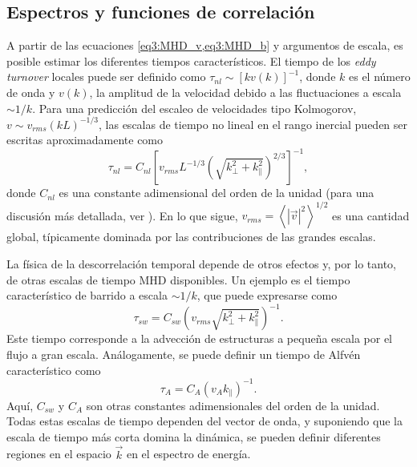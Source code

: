 \subsection{Espectros y funciones de correlación}\label{sec3:Wfspectrum_and_Gamma}

A partir de las ecuaciones \cref{eq3:MHD_v,eq3:MHD_b} y argumentos de
escala, es posible estimar los diferentes tiempos característicos. El
tiempo de los \textit{eddy turnover} locales puede ser definido como
$\tau_{nl} \sim \left[ k v(k) \right]^{-1}$, donde $k$ es el número de
onda y $v(k)$, la amplitud de la velocidad debido a las fluctuaciones
a escala $\sim 1/k$. Para una predicción del escaleo de velocidades
tipo Kolmogorov, $v \sim v_{rms} \left(kL\right)^{-1/3}$, las escalas
de tiempo no lineal en el rango inercial pueden ser escritas
aproximadamente como
\begin{equation}
\tau_{nl} = C_{nl} \left [
   v_{rms} L^{-1/3} \left(\sqrt{k^2_\perp +
   k^2_\parallel}\right)^{2/3}\right ]^{-1},
\label{eq3:taunl}
\end{equation}
donde $C_{nl}$ es una constante adimensional del orden de la
unidad (para una discusión más detallada,
ver \cite{zhou_magnetohydrodynamic_2004}). En lo que sigue, $v_{rms}
= \left\langle |\vec{v}|^2 \right\rangle ^{1/2}$ es una cantidad
global, típicamente dominada por las contribuciones de las grandes
escalas.

La física de la descorrelación temporal depende de otros efectos y,
por lo tanto, de otras escalas de tiempo MHD disponibles. Un ejemplo
es el tiempo característico de barrido a escala $\sim 1/k$, que puede
expresarse como
\begin{equation}
\tau_{sw} = C_{sw} \left( v_{rms}\sqrt{k^2_\perp + k^2_\parallel}
    \right)^{-1}.
\label{eq3:tausw}
\end{equation}
Este tiempo corresponde a la advección
de estructuras a pequeña escala por el flujo a gran
escala. Análogamente, se puede definir un tiempo de Alfvén
característico como
\begin{equation}
\tau_A= C_A \left( v_A k_\parallel \right)^{-1}.
\label{eq3:taua}
\end{equation}
Aquí, $C_{sw} $ y $C_A$ son otras constantes adimensionales del
orden de la unidad. Todas estas escalas de tiempo dependen del vector
de onda, y suponiendo que la escala de tiempo más corta domina la
dinámica, se pueden definir diferentes regiones en el espacio
$\vec{k}$ en el espectro de energía.

